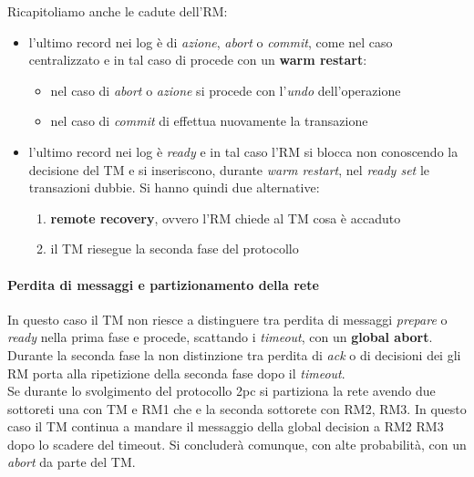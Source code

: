 \documentclass[a4paper,12pt, oneside]{book}
\begin{document}
Ricapitoliamo anche le cadute dell'RM:
\begin{itemize}
  \item l'ultimo record nei log è di \textit{azione}, \textit{abort} o
  \textit{commit}, come nel caso centralizzato e in tal caso di procede con un
  \textbf{warm restart}:
  \begin{itemize}
    \item nel caso di \textit{abort} o \textit{azione} si procede con
    l'\textit{undo} dell'operazione
    \item nel caso di \textit{commit} di effettua nuovamente la transazione
  \end{itemize}
  \item l'ultimo record nei log è \textit{ready} e in tal caso l'RM si blocca
  non conoscendo la decisione del TM e si inseriscono, durante \textit{warm
    restart}, nel \textit{ready set} le transazioni dubbie. Si hanno quindi due
  alternative:
  \begin{enumerate}
    \item \textbf{remote recovery}, ovvero l'RM chiede al TM cosa è accaduto
    \item il TM riesegue la seconda fase del protocollo
  \end{enumerate}
\end{itemize}
\paragraph{Perdita di messaggi e partizionamento della rete}
In questo caso il TM non riesce a distinguere tra perdita di messaggi
\textit{prepare} o \textit{ready} nella prima fase e procede, scattando i
\textit{timeout}, con un \textbf{global abort}. \\
Durante la seconda fase la non distinzione tra perdita di \textit{ack} o di
decisioni dei gli RM porta alla ripetizione della seconda fase dopo il
\textit{timeout}.\\
Se durante lo svolgimento del protocollo 2pc si partiziona la rete avendo due
sottoreti una con TM e RM1 che e la seconda sottorete con RM2, RM3. In questo
caso il TM continua a mandare il messaggio della global decision a RM2 RM3 dopo
lo scadere del timeout. Si concluderà comunque, con alte probabilità, con un
\textit{abort} da parte del TM.
\end{document}

